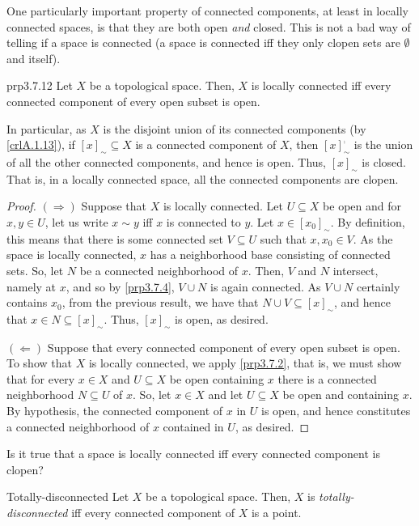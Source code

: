 One particularly important property of connected components, at least in locally connected spaces, is that they are both open \emph{and} closed.  This is not a bad way of telling if a space is connected (a space is connected iff they only clopen sets are $\emptyset$ and itself).
\begin{prp}{}{prp3.7.12}
Let $X$ be a topological space.  Then, $X$ is locally connected iff every connected component of every open subset is open.
\begin{rmk}
In particular, as $X$ is the disjoint union of its connected components (by \cref{crlA.1.13}), if $[x]_{\sim}\subseteq X$ is a connected component of $X$, then $[x]_{\sim}^{\comp}$ is the union of all the other connected components, and hence is open.  Thus, $[x]_{\sim}$ is closed.  That is, in a locally connected space, all the connected components are clopen.
\end{rmk}
\begin{proof}
$(\Rightarrow )$ Suppose that $X$ is locally connected.  Let $U\subseteq X$ be open and for $x,y\in U$, let us write $x\sim y$ iff $x$ is connected to $y$.  Let $x\in [x_0]_{\sim}$.  By definition, this means that there is some connected set $V\subseteq U$ such that $x,x_0\in V$.  As the space is locally connected, $x$ has a neighborhood base consisting of connected sets.  So, let $N$ be a connected neighborhood of $x$.  Then, $V$ and $N$ intersect, namely at $x$, and so by \cref{prp3.7.4}, $V\cup N$ is again connected.  As $V\cup N$ certainly contains $x_0$, from the previous result, we have that $N\cup V\subseteq [x]_{\sim}$, and hence that $x\in N\subseteq [x]_{\sim}$.  Thus, $[x]_{\sim}$ is open, as desired.

\blankline
\noindent
$(\Leftarrow )$ Suppose that every connected component of every open subset is open.  To show that $X$ is locally connected, we apply \cref{prp3.7.2}, that is, we must show that for every $x\in X$ and $U\subseteq X$ be open containing $x$ there is a connected neighborhood $N\subseteq U$ of $x$.  So, let $x\in X$ and let $U\subseteq X$ be open and containing $x$.  By hypothesis, the connected component of $x$ in $U$ is open, and hence constitutes a connected neighborhood of $x$ contained in $U$, as desired.
\end{proof}
\end{prp}
\begin{exr}{}{}
Is it true that a space is locally connected iff every connected component is clopen?
\end{exr}
\begin{dfn}{Totally-disconnected}{}
Let $X$ be a topological space.  Then, $X$ is \emph{totally-disconnected} iff every connected component of $X$ is a point.
\end{dfn}
